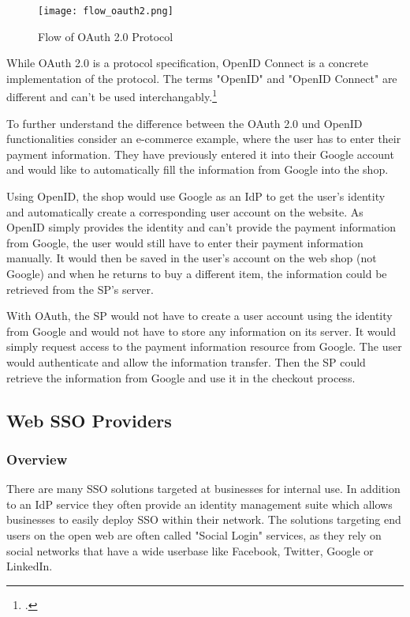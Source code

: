 \begin{figure}[H]
    \centering
    \caption{Flow of OAuth 2.0 Protocol}
	\label{fig:flow_oauth2}
    \texttt{[image: flow\_oauth2.png]}
    \\
    \cite[Source:][p. 22]{Wesener2021}
\end{figure}

While OAuth 2.0 is a protocol specification, OpenID Connect is a concrete implementation of the protocol.
The terms "OpenID" and "OpenID Connect" are different and can't be used interchangably.\footcite[Cp.][]{Wesener2021}

To further understand the difference between the OAuth 2.0 und OpenID functionalities consider an e-commerce example,
where the user has to enter their payment information. They have previously entered it into their Google account and would
like to automatically fill the information from Google into the shop.

Using OpenID, the shop would use Google as an \ac{IdP} to get the user's identity and automatically create a corresponding
user account on the website. As OpenID simply provides the identity and can't provide the payment information from Google,
the user would still have to enter their payment information manually.
It would then be saved in the user's account on the web shop (not Google) and when he returns to buy a different item,
the information could be retrieved from the \ac{SP}'s server.

With OAuth, the \ac{SP} would not have to create a user account using the identity from Google and would not have to store any
information on its server. It would simply request access to the payment information resource from Google. The user would
authenticate and allow the information transfer. Then the \ac{SP} could retrieve the information from Google and use it
in the checkout process.

\subsection{Web SSO Providers}

\subsubsection{Overview}

There are many \ac{SSO} solutions targeted at businesses for internal use.
In addition to an \ac{IdP} service they often provide an identity management suite which allows businesses
to easily deploy \ac{SSO} within their network.
The solutions targeting end users on the open web are often called "Social Login" services, as they rely on 
social networks that have a wide userbase like Facebook, Twitter, Google or LinkedIn.

